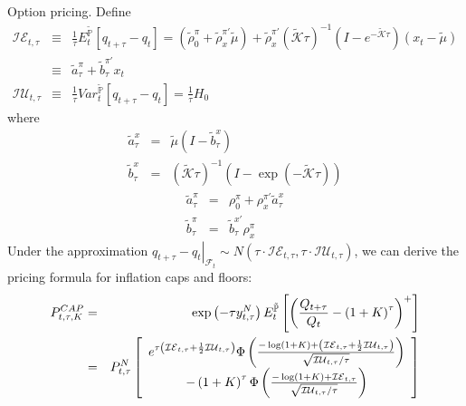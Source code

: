 \documentclass{article}
\begin{document}
Option pricing. Define%
\begin{eqnarray*}
\mathcal{IE}_{t,\tau } &\equiv &\frac{1}{\tau }E_{t}^{\mathbb{\tilde{P}}}%
\left[ q_{t+\tau }-q_{t}\right] =\left( \widetilde{\rho }_{0}^{\pi }+%
\widetilde{\rho }_{x}^{\pi \prime }\widetilde{\mu }\right) +\widetilde{\rho }%
_{x}^{\pi \prime }\left( \widetilde{\mathcal{K}}\tau \right) ^{-1}\left(
I-e^{-\widetilde{\mathcal{K}}\tau }\right) \left( x_{t}-\widetilde{\mu }%
\right)  \\
&\equiv &\tilde{a}_{\tau }^{\pi }+\tilde{b}_{\tau }^{\pi \prime }x_{t} \\
\mathcal{IU}_{t,\tau } &\equiv &\frac{1}{\tau }Var_{t}^{\mathbb{\tilde{P}}}%
\left[ q_{t+\tau }-q_{t}\right] =\frac{1}{\tau }H_{0}
\end{eqnarray*}%
where%
\begin{eqnarray*}
\tilde{a}_{\tau }^{x} &=&\tilde{\mu}\left( I-\tilde{b}_{\tau }^{x}\right)  \\
\tilde{b}_{\tau }^{x} &=&\left( \mathcal{\tilde{K}}\tau \right) ^{-1}\left(
I-\exp \left( -\mathcal{\tilde{K}}\tau \right) \right) 
\end{eqnarray*}%
\begin{eqnarray*}
\tilde{a}_{\tau }^{\pi } &=&\rho _{0}^{\pi }+\rho _{x}^{\pi \prime }\tilde{a}%
_{\tau }^{x} \\
\tilde{b}_{\tau }^{\pi } &=&\tilde{b}_{\tau }^{x\prime }\rho _{x}^{\pi }
\end{eqnarray*}%
Under the approximation $\left. q_{t+\tau }-q_{t}\right\vert _{\mathcal{F}%
_{t}}\sim N\left( \tau \cdot \mathcal{IE}_{t,\tau },\tau \cdot \mathcal{IU}%
_{t,\tau }\right) $, we can derive the pricing formula for inflation caps
and floors:%
\begin{eqnarray*}
P_{t,\tau ,K}^{CAP} &=&\exp \left( -\tau y_{t,\tau }^{N}\right) E_{t}^{%
\mathbb{\tilde{P}}}\left[ \left( \frac{Q_{t+\tau }}{Q_{t}}-\left( 1+K\right)
^{\tau }\right) ^{+}\right]  \\
&=&P_{t,\tau }^{N}\left[ 
\begin{array}{c}
e^{\tau \left( \mathcal{IE}_{t,\tau }+\frac{1}{2}\mathcal{IU}_{t,\tau
}\right) }\Phi \left( \frac{-\log \left( 1+K\right) +\left( \mathcal{IE}%
_{t,\tau }+\frac{1}{2}\mathcal{IU}_{t,\tau }\right) }{\sqrt{\mathcal{IU}%
_{t,\tau }/\tau }}\right)  \\ 
-\left( 1+K\right) ^{\tau }\Phi \left( \frac{-\log \left( 1+K\right) +%
\mathcal{IE}_{t,\tau }}{\sqrt{\mathcal{IU}_{t,\tau }/\tau }}\right) 
\end{array}%
\right] 
\end{eqnarray*}%
\end{document}
